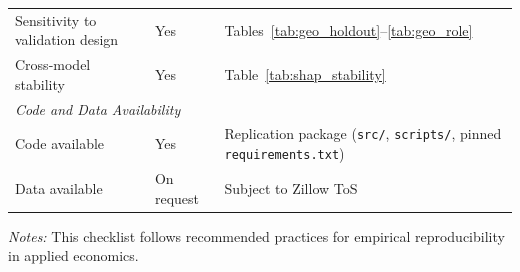 \begin{table}[H]
\begin{threeparttable}
\begin{tabular}{p{6cm}p{3cm}p{4cm}}
Sensitivity to validation design & Yes & Tables~\ref{tab:geo_holdout}--\ref{tab:geo_role} \\
Cross-model stability & Yes & Table~\ref{tab:shap_stability} \\
\midrule
\multicolumn{3}{l}{\textit{Code and Data Availability}} \\
Code available & Yes & Replication package (\texttt{src/}, \texttt{scripts/}, pinned \texttt{requirements.txt}) \\
Data available & On request & Subject to Zillow ToS \\
\bottomrule
\end{tabular}
\begin{tablenotes}
\small
\item \textit{Notes:} This checklist follows recommended practices for empirical reproducibility in applied economics.
\end{tablenotes}
\end{threeparttable}
\end{table}
